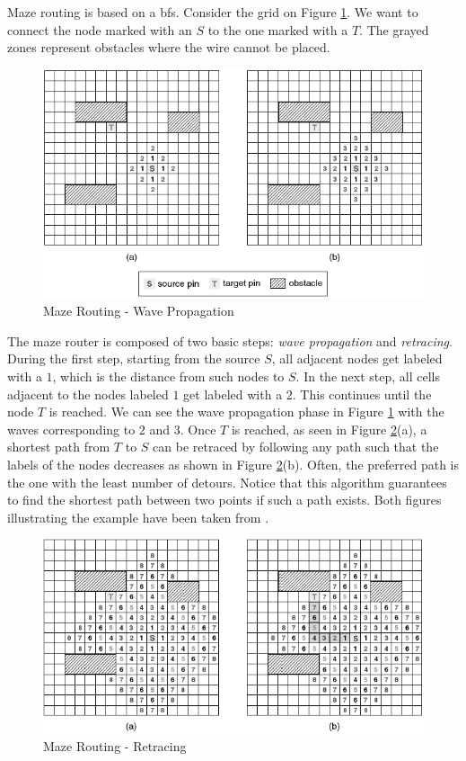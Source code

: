 Maze routing is based on a \gls{bfs}. Consider the grid on Figure \ref{fig:maze}. We want to connect the node marked with an $S$ to the one marked with a $T$. The grayed zones represent obstacles where the wire cannot be placed. \\

\begin{figure}[h!]
  \centering
  \includegraphics[scale=0.6]{img/bckgrnd/maze.png}
  \caption{Maze Routing - Wave Propagation}
  \label{fig:maze}
\end{figure} 

The maze router is composed of two basic steps: \textit{wave propagation} and \textit{retracing}. During the first step, starting from the source $S$, all adjacent nodes get labeled with a $1$, which is the distance from such nodes to $S$. In the next step, all cells adjacent to the nodes labeled $1$ get labeled with a $2$. This continues until the node $T$ is reached. We can see the wave propagation phase in Figure \ref{fig:maze} with the waves corresponding to $2$ and $3$. Once $T$ is reached, as seen in Figure \ref{fig:maze2}(a), a shortest path from $T$ to $S$ can be retraced by following any path such that the labels of the nodes decreases as shown in Figure \ref{fig:maze2}(b). Often, the preferred path is the one with the least number of detours. Notice that this algorithm guarantees to find the shortest path between two points if such a path exists. Both figures illustrating the example have been taken from \cite{changcheng}. \\

\begin{figure}[h!]
  \centering
  \includegraphics[scale=0.6]{img/bckgrnd/maze2.png}
  \caption{Maze Routing - Retracing}
  \label{fig:maze2}
\end{figure} 

